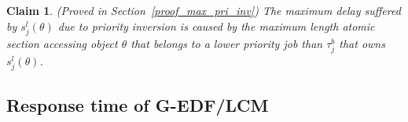 \documentclass[conference]{sig-alternate}
\newtheorem{clm}{Claim}
\begin{document}
\begin{clm}
\label{max_pri_inv}
(Proved in Section~\ref{proof_max_pri_inv}) The maximum delay suffered by $s_j^l(\theta)$ due to priority inversion is caused by the maximum length atomic section accessing object $\theta$ that belongs to a lower priority job than $\tau_j^b$ that owns $s_j^l(\theta)$.
\end{clm}

\subsection{\label{response g-edf/lcm} Response time of G-EDF/LCM}
\end{document}
